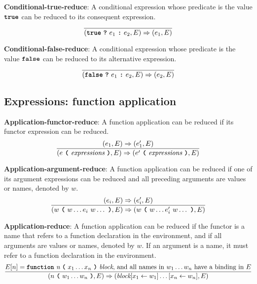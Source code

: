 \vspace{10mm}
\textbf{Conditional-true-reduce}: A conditional
expression whose predicate is the value
$\textbf{\texttt{true}}$
can be reduced to its consequent expression.
\[
\frac{
}{
  (\textbf{\texttt{true}}\  \textbf{\texttt{?}}\ e_1\ \textbf{\texttt{:}}\ e_2, E)
  \Rightarrow
  (e_1, E)
}
\]

\vspace{10mm}
\textbf{Conditional-false-reduce}: A conditional
expression whose predicate is the value
$\textbf{\texttt{false}}$
can be reduced to its alternative expression.
\[
\frac{
}{
  (\textbf{\texttt{false}}\  \textbf{\texttt{?}}\ e_1\ \textbf{\texttt{:}}\ e_2, E)
  \Rightarrow
  (e_2, E)
}
\]


\subsection*{Expressions: function application}

\textbf{Application-functor-reduce}: A function application
can be reduced if its functor expression can be reduced.
\[
\frac{
  ( e_1 , E ) \Rightarrow (e_1', E)
}{
  (e\  \textbf{\texttt{(}}\ \textit{expressions} \ \textbf{\texttt{)}}, E)
  \Rightarrow
  (e'\  \textbf{\texttt{(}}\ \textit{expressions} \ \textbf{\texttt{)}}, E)
}
\]

\vspace{10mm}
\textbf{Application-argument-reduce}: A function application
can be reduced if one of its argument expressions can be reduced and all
preceding arguments are values or names, denoted by $w$.
\[
\frac{
  ( e_i , E ) \Rightarrow (e_i', E)
}{
  (w\  \textbf{\texttt{(}}\ w \ldots e_i \ w \ldots\ \textbf{\texttt{)}}, E)
  \Rightarrow
  (w\  \textbf{\texttt{(}}\ w \ldots e_i' \ w \ldots\ \textbf{\texttt{)}}, E)
}
\]

\vspace{10mm}
\textbf{Application-reduce}: A function application
can be reduced if the functor is a name that refers to
a function declaration in the environment, and if all
arguments are values or names, denoted by $w$. If an argument
is a name, it must refer to a function declaration in the
environment.
\[
\frac{
  E[n] = \textbf{\texttt{function}}\  \textit{n} \ 
                 \textbf{\texttt{(}}\  x_1 \ldots x_n
                 \ \textbf{\texttt{)}}\ \textit{block}
\mbox{, and all names in $w_1 \ldots w_n$ have a binding in $E$}
}{
  (n\  \textbf{\texttt{(}}\ w_1 \ldots w_n\ \textbf{\texttt{)}}, E)
  \Rightarrow
  (\textit{block}[x_1 \leftarrow w_1]\ldots[x_n \leftarrow w_n], E)
}
\]





